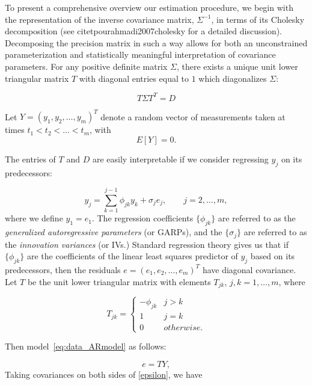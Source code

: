 \documentclass[12pt]{article}
\theoremstyle{definition}
\begin{document}
To present a comprehensive overview our estimation procedure, we begin with the representation of the inverse covariance matrix, $\Sigma^{-1}$, in terms of its Cholesky decomposition (see citet{pourahmadi2007cholesky} for a detailed discussion). Decomposing the precision matrix in such a way allows for both an unconstrained parameterization and statistically meaningful interpretation of covariance parameters. For any positive definite matrix $\Sigma$, there exists a unique unit lower triangular matrix $T$ with diagonal entries equal to $1$ which diagonalizes $\Sigma$:

\begin{equation}
\nonumber T \Sigma T^T = D
\end{equation}
\noindent

Let $Y = \left( y_{1}, y_{2}, \dots, y_{m} \right)^T$ denote a random vector of measurements taken at times $t_{1} < t_{2} < \dots< t_{m}$, with
\[
E\left[ Y \right] = 0.
\]

The entries of $T$ and $D$ are easily interpretable if we consider regressing $y_{j}$ on its predecessors:

\begin{equation}
{y}_{j}  = \sum_{k=1}^{j-1} \phi_{jk} y_{k} + \sigma_{j}e_{j}, \qquad j=2,\dots,m, \label{eq:data_ARmodel}
\end{equation}
\noindent where we define $y_{1}=e_{1}$. The regression coefficients $\lbrace \phi_{jk} \rbrace$ are referred to as the \emph{generalized autoregressive parameters} (or GARPs), and the $\lbrace \sigma_{j} \rbrace$ are referred to as the \emph{innovation variances} (or IVs.) Standard regression theory gives us that if $\lbrace \phi_{jk} \rbrace$ are the coefficients of the linear least squares predictor of $y_{j}$ based on its predecessors, then the residuals $e =\left( e_{1}, e_{2},\dots, e_{m} \right)^T$ have diagonal covariance. Let $T$ be the unit lower triangular matrix with elements $T_{jk}$, $j,k=1,\dots,m$, where

\[
T_{jk} = \left\{
\begin{array}{ll}
-\phi_{jk} & j > k\\
1 & j = k \\
0 & otherwise.
\end{array}\right.
\]

Then model~\ref{eq:data_ARmodel} as follows: 

\begin{equation}
e = T Y, \label{epsilon}
\end{equation}
\noindent
Taking covariances on both sides of \eqref{epsilon}, we have
\end{document}
